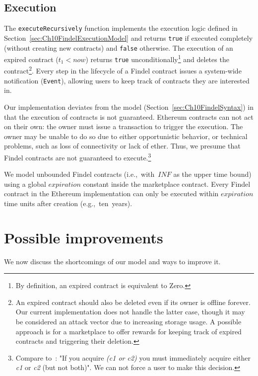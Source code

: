 \subsection{Execution} \label{sec:Ch10FindelExecutionImplementation}

The \texttt{executeRecursively} function implements the execution logic defined in Section~\ref{sec:Ch10FindelExecutionModel} and returns \texttt{true} if executed completely (without creating new contracts) and \texttt{false} otherwise.
The execution of an expired contract ($t_1 < now$) returns \texttt{true} unconditionally\footnote{By definition, an expired contract is equivalent to \(\mathrm{Zero}\).} and deletes the contract\footnote{An expired contract should also be deleted even if its owner is offline forever. Our current implementation does not handle the latter case, though it may be considered an attack vector due to increasing storage usage. A possible approach is for a marketplace to offer rewards for keeping track of expired contracts and triggering their deletion.}.
Every step in the lifecycle of a Findel contract issues a system-wide notification (\texttt{Event}), allowing users to keep track of contracts they are interested in.

Our implementation deviates from the model (Section~\ref{sec:Ch10FindelSyntax}) in that the execution of contracts is not guaranteed.
Ethereum contracts can not act on their own: the owner must issue a transaction to trigger the execution.
The owner may be unable to do so due to either opportunistic behavior, or technical problems, such as loss of connectivity or lack of ether.
Thus, we presume that Findel contracts are not guaranteed to execute.\footnote{Compare to~\cite{PeytonJones2000}: "If you acquire \textit{(c1 or c2)} you must immediately acquire either \textit{c1} or \textit{c2} (but not both)". We can not force a user to make this decision.}

We model unbounded Findel contracts (i.e.,~with~$INF$ as the upper time bound) using a global $expiration$ constant inside the marketplace contract.
Every Findel contract in the Ethereum implementation can only be executed within $expiration$ time units after creation (e.g.,~ten~years).


\section{Possible improvements}

We now discuss the shortcomings of our model and ways to improve it.


